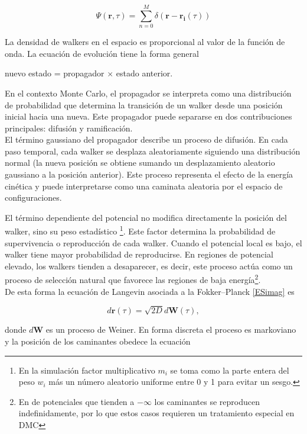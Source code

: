 \documentclass[11pt,a4paper,twoside,pdf]{article}
\numberwithin{equation}{section}
\begin{document}
$$
    \Psi(\mathbf{r}, \tau) = \sum_{n=0}^M \delta(\mathbf{r} - \mathbf{r_i}(\tau))
$$

La densidad de walkers en el espacio es proporcional al valor de la función de onda. La ecuación de evolución tiene la forma general

\begin{center}
nuevo estado = propagador $\times$ estado anterior.
\end{center}

En el contexto Monte Carlo, el propagador se interpreta como una distribución de probabilidad que determina la transición de un walker desde una posición inicial hacia una nueva. Este propagador puede separarse en dos contribuciones principales: difusión y ramificación.\\


El término gaussiano del propagador describe un proceso de difusión. En cada paso temporal, cada walker se desplaza aleatoriamente siguiendo una distribución normal (la nueva posición se obtiene sumando un desplazamiento aleatorio gaussiano a la posición anterior). Este proceso representa el efecto de la energía cinética y puede interpretarse como una caminata aleatoria por el espacio de configuraciones.


El término dependiente del potencial no modifica directamente la posición del walker, sino su peso estadístico \footnote{En la simulación factor multiplicativo $m_i$ se toma como la parte entera del peso $w_i$ más un número aleatorio uniforme entre 0 y 1 para evitar un sesgo.}. Este factor determina la probabilidad de supervivencia o reproducción de cada walker. Cuando el potencial local es bajo, el walker tiene mayor probabilidad de reproducirse. En regiones de potencial elevado, los walkers tienden a desaparecer, es decir, este proceso actúa como un proceso de selección natural que favorece las regiones de baja energía\footnote{En de potenciales que tienden a $-\infty$ los caminantes se reproducen indefinidamente, por lo que estos casos requieren un tratamiento especial en DMC}.\\

De esta forma la ecuación de Langevin asociada a la Fokker--Planck \ref{ESimag} es \cite{van1992stochastic}

$$
    d \mathbf{r} (\tau) = \sqrt{2D} d \mathbf{W} (\tau),
$$

donde $d\mathbf{W}$ es un proceso de Weiner. En forma discreta el proceso es markoviano y la posición de los caminantes obedece la ecuación
\end{document}
